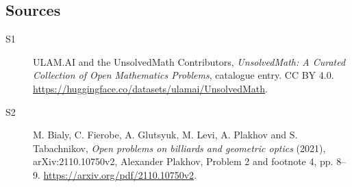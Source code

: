 \documentclass[11pt]{article}
\begin{document}
\subsection{Sources}
\begin{description}
\item[\hypertarget{source:statement:1}{S1}] ULAM.AI and the UnsolvedMath Contributors, \emph{UnsolvedMath: A Curated Collection of Open Mathematics Problems}, catalogue entry. CC BY 4.0. \url{https://huggingface.co/datasets/ulamai/UnsolvedMath}.
\item[\hypertarget{source:statement:2}{S2}] M. Bialy, C. Fierobe, A. Glutsyuk, M. Levi, A. Plakhov and S. Tabachnikov, \emph{Open problems on billiards and geometric optics} (2021), arXiv:2110.10750v2, Alexander Plakhov, Problem 2 and footnote 4, pp. 8--9. \url{https://arxiv.org/pdf/2110.10750v2}.
\end{description}
\label{end:statement}
\end{document}
